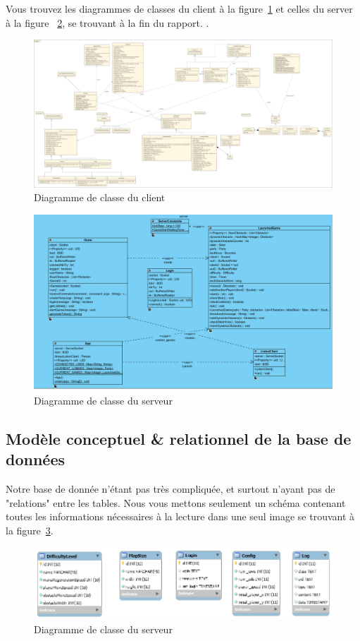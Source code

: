 \documentclass[a4paper,12pt]{article}
\begin{document}
	Vous trouvez les diagrammes de classes du client à la figure~\ref{fig:UML_client} et celles du server à la figure ~\ref{fig:UML_server}, se trouvant à la fin du rapport.
	.
	\begin{figure}[ht]
		\centering
		\includegraphics[width=\textwidth]{../Schemas/UML_FROGGER.png}
		\caption{Diagramme de classe du client}
		\label{fig:UML_client}
	\end{figure}
	\begin{figure}[ht]
		\centering
		\includegraphics[width=\textwidth]{../Schemas/UML_SERVER.png}
		\caption{Diagramme de classe du serveur}
		\label{fig:UML_server}
	\end{figure}
	
	\subsection{Modèle conceptuel \& relationnel de la base de données}
	Notre base de donnée n'étant pas très compliquée, et surtout n'ayant pas de "relations" entre les tables. Nous vous mettons seulement un schéma contenant toutes les informations nécessaires à la lecture dans une seul image se trouvant à la figure~\ref{fig:ER_DB}.
	\begin{figure}[ht]
		\centering
		\includegraphics[width=\textwidth]{../Schemas/DB_ER.png}
		\caption{Diagramme de classe du serveur}
		\label{fig:ER_DB}
	\end{figure}
	
\end{document}
